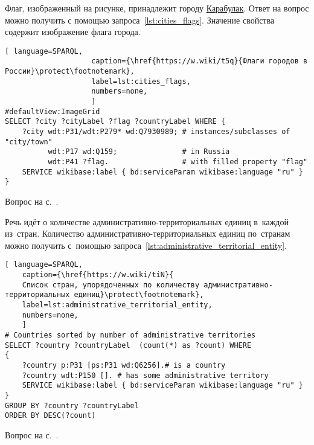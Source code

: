 \begin{task}
    \label{answer:cities_flags}
    Флаг, изображенный на рисунке, 
    принадлежит городу \href{https://w.wiki/oLF}{Карабулак}. 
    Ответ на вопрос можно получить с помощью запроса~\ref{lst:cities_flags}. 
    Значение свойства  
    содержит изображение флага города.
    
    \begin{lstlisting}[ language=SPARQL, 
                    caption={\href{https://w.wiki/t5q}{Флаги городов в России}\protect\footnotemark},
                    label=lst:cities_flags,
                    numbers=none,
                    ]
#defaultView:ImageGrid
SELECT ?city ?cityLabel ?flag ?countryLabel WHERE {
    ?city wdt:P31/wdt:P279* wd:Q7930989; # instances/subclasses of "city/town"
          wdt:P17 wd:Q159;               # in Russia
          wdt:P41 ?flag.                 # with filled property "flag"
    SERVICE wikibase:label { bd:serviceParam wikibase:language "ru" }
}
\end{lstlisting}
    
    \small{\AnswerBackref Вопрос на с.~\pageref{lst:countries_sister_cities_with_Russia}.}
\end{task}




\hfil{}\hfil%
\newpage
\begin{task}
	\label{answer:administrative_territorial}
Речь идёт о количестве 
административно-территориальных единиц в~каждой из~стран. 
Количество административно-территориальных единиц по~странам 
    можно получить с~помощью запроса~\ref{lst:administrative_territorial_entity}.
	
\begin{lstlisting}[ language=SPARQL, 
	caption={\href{https://w.wiki/tiN}{
	Список стран, упорядоченных по количеству административно-территориальных единиц}\protect\footnotemark},
	label=lst:administrative_territorial_entity,
    numbers=none,
    ]
# Countries sorted by number of administrative territories
SELECT ?country ?countryLabel  (count(*) as ?count) WHERE
{
    ?country p:P31 [ps:P31 wd:Q6256].# is a country
    ?country wdt:P150 []. # has some administrative territory
    SERVICE wikibase:label { bd:serviceParam wikibase:language "ru" }
}
GROUP BY ?country ?countryLabel
ORDER BY DESC(?count)
\end{lstlisting}
	
\small{\AnswerBackref Вопрос на с.~\pageref{lst:age_of_country}.}
\end{task}




